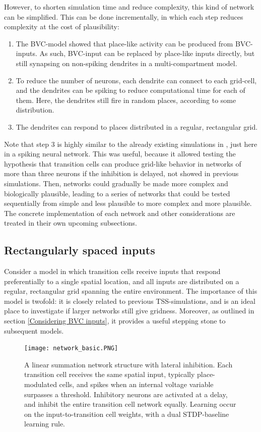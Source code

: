 \documentclass{article}
\begin{document}
    However, to shorten simulation time and reduce complexity, this kind of network can be simplified. This can be done incrementally, in which each step reduces complexity at the cost of plausibility:
    \begin{enumerate}
        \item The BVC-model showed that place-like activity can be produced from BVC-inputs. As such, BVC-input can be replaced by place-like inputs directly, but still synapsing on non-spiking dendrites in a multi-compartment model.
        \item To reduce the number of neurons, each dendrite can connect to each grid-cell, and the dendrites can be spiking to reduce computational time for each of them. Here, the dendrites still fire in random places, according to some distribution.
        \item The dendrites can respond to places distributed in a regular, rectangular grid.
    \end{enumerate}
 
    Note that step 3 is highly similar to the already existing simulations in \parencite{Waniek2017}, just here in a spiking neural network. This was useful, because it allowed testing the hypothesis that transition cells can produce grid-like behavior in networks of more than three neurons if the inhibition is delayed, not showed in previous simulations. Then, networks could gradually be made more complex and biologically plausible, leading to a series of networks that could be tested sequentially from simple and less plausible to more complex and more plausible. The concrete implementation of each network and other considerations are treated in their own upcoming subsections.

    \subsection{Rectangularly spaced inputs} \label{Rect input}
    Consider a model in which transition cells receive inputs that respond preferentially to a single spatial location, and all inputs are distributed on a regular, rectangular grid spanning the entire environment. The importance of this model is twofold: it is closely related to previous TSS-simulations, and is an ideal place to investigate if larger networks still give gridness. Moreover, as outlined in section \ref{Considering BVC inputs}, it provides a useful stepping stone to subsequent models.

    \begin{figure}[h]
        \texttt{[image: network\_basic.PNG]}
        \caption{A linear summation network structure with lateral inhibition. Each transition cell receives the same spatial input, typically place-modulated cells, and spikes when an internal voltage variable surpasses a threshold. Inhibitory neurons are activated at a delay, and inhibit the entire transition cell network equally. Learning occur on the input-to-transition cell weights, with a dual STDP-baseline learning rule.}
        \label{network_basic}
    \end{figure}
    
\end{document}
